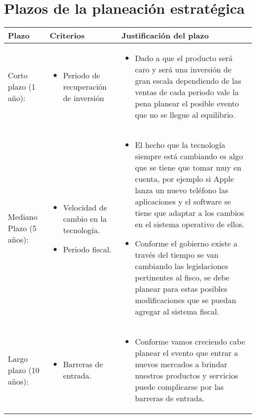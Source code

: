 \documentclass{article}
\begin{document}
\section{Plazos de la planeación estratégica}
\begin{center}
    \begin{tabular}{ |p{4cm}|p{4cm}|p{8cm}| }
        \hline
            Plazo & Criterios & Justificación del plazo \\
        \hline
            Corto plazo (1 año): 
            & 
            \begin{itemize}
                \item Periodo de recuperación de inversión
            \end{itemize}
            & 
            \begin{itemize}
                \item Dado a que el producto será caro y será una inversión de gran escala dependiendo de las ventas de cada periodo vale la pena planear el posible evento que no se llegue al equilibrio.
            \end{itemize}
            \\ 
        \hline
            Mediano Plazo (5 años):
            & 
            \begin{itemize}
                \item Velocidad de cambio en la tecnología.
                \item Periodo fiscal.
            \end{itemize}
            & 
            \begin{itemize}
                \item El hecho que la tecnología siempre está cambiando es algo que se tiene que tomar muy en cuenta, por ejemplo si Apple lanza un nuevo teléfono las aplicaciones y el software se tiene que adaptar a los cambios en el sistema operativo de ellos.
                \item Conforme el gobierno existe a través del tiempo se van cambiando las legislaciones pertinentes al fisco, se debe planear para estas posibles modificaciones que se puedan agregar al sistema fiscal.
            \end{itemize}
            \\ 
        \hline
            Largo plazo (10 años): 
            & 
            \begin{itemize}
                \item Barreras de entrada.
            \end{itemize}
            & 
            \begin{itemize}
                \item Conforme vamos creciendo cabe planear el evento que entrar a nuevos mercados a brindar nuestros productos y servicios puede complicarse por las barreras de entrada. 
            \end{itemize}
            \\ 
        \hline
    \end{tabular}
\end{center}
\end{document}
